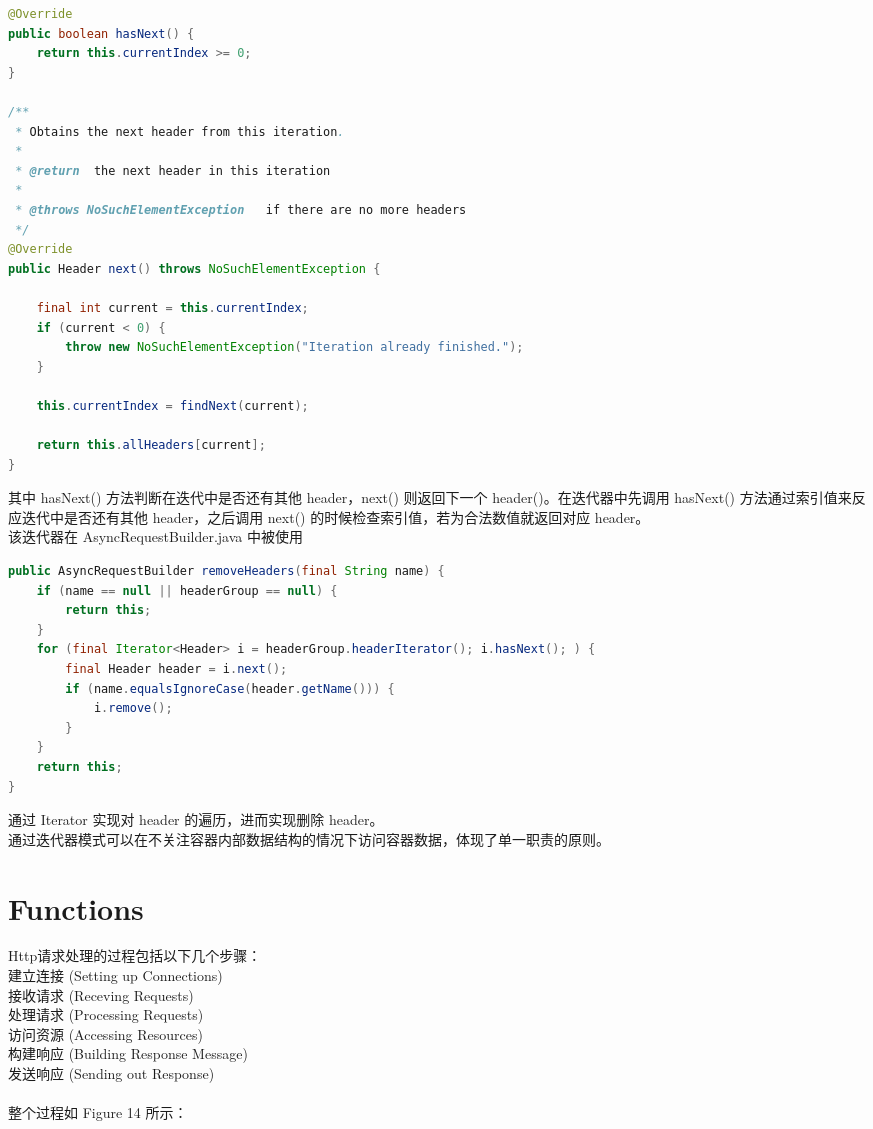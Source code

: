 \documentclass{article}
\begin{document}
	\begin{lstlisting}[language={java}]
@Override
public boolean hasNext() {
    return this.currentIndex >= 0;
}

/**
 * Obtains the next header from this iteration.
 *
 * @return  the next header in this iteration
 *
 * @throws NoSuchElementException   if there are no more headers
 */
@Override
public Header next() throws NoSuchElementException {

    final int current = this.currentIndex;
    if (current < 0) {
        throw new NoSuchElementException("Iteration already finished.");
    }

    this.currentIndex = findNext(current);

    return this.allHeaders[current];
}
	\end{lstlisting}
	\begin{CJK}{UTF8}{gbsn}
		\indent \indent  其中 hasNext() 方法判断在迭代中是否还有其他 header，next() 则返回下一个 header()。在迭代器中先调用 hasNext() 方法通过索引值来反应迭代中是否还有其他 header，之后调用 next() 的时候检查索引值，若为合法数值就返回对应 header。\\
		\indent 该迭代器在 AsyncRequestBuilder.java 中被使用
	\end{CJK}{}
	\begin{lstlisting}[language={java}]
public AsyncRequestBuilder removeHeaders(final String name) {
    if (name == null || headerGroup == null) {
        return this;
    }
    for (final Iterator<Header> i = headerGroup.headerIterator(); i.hasNext(); ) {
        final Header header = i.next();
        if (name.equalsIgnoreCase(header.getName())) {
            i.remove();
        }
    }
    return this;
}
	\end{lstlisting}
	\begin{CJK}{UTF8}{gbsn}
		\indent \indent 通过 Iterator 实现对 header 的遍历，进而实现删除 header。\\
		\indent 通过迭代器模式可以在不关注容器内部数据结构的情况下访问容器数据，体现了单一职责的原则。
	\end{CJK}{}
	\clearpage
	\section{Functions}
	\begin{CJK}{UTF8}{gbsn}
		Http请求处理的过程包括以下几个步骤：\\
		\indent 建立连接 (Setting up Connections)\\
		\indent 接收请求 (Receving Requests)\\
		\indent 处理请求 (Processing Requests)\\
		\indent 访问资源 (Accessing Resources)\\
		\indent 构建响应 (Building Response Message)\\
		\indent 发送响应 (Sending out Response)\\
		\hspace*{\fill} \\ %
		整个过程如 Figure 14 所示：
	\end{CJK}{}
\end{document}
